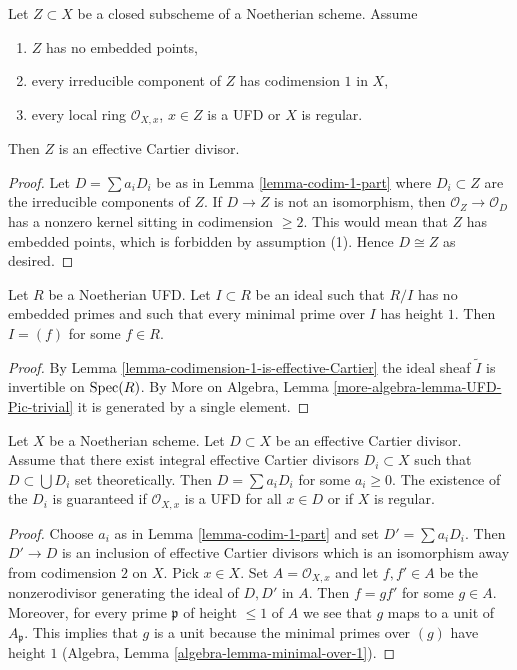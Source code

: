 \begin{lemma}
\label{lemma-codimension-1-is-effective-Cartier}
Let $Z \subset X$ be a closed subscheme of a Noetherian scheme. Assume
\begin{enumerate}
\item $Z$ has no embedded points,
\item every irreducible component of $Z$ has codimension $1$ in $X$,
\item every local ring $\mathcal{O}_{X, x}$, $x \in Z$ is
a UFD or $X$ is regular.
\end{enumerate}
Then $Z$ is an effective Cartier divisor.
\end{lemma}

\begin{proof}
Let $D = \sum a_i D_i$ be as in Lemma \ref{lemma-codim-1-part}
where $D_i \subset Z$ are the irreducible components of $Z$.
If $D \to Z$ is not an isomorphism, then $\mathcal{O}_Z \to \mathcal{O}_D$
has a nonzero kernel sitting in codimension $\geq 2$. This
would mean that $Z$ has embedded points, which is forbidden
by assumption (1). Hence $D \cong Z$ as desired.
\end{proof}

\begin{lemma}
\label{lemma-UFD-one-equation-CM}
Let $R$ be a Noetherian UFD. Let $I \subset R$ be an ideal
such that $R/I$ has no embedded primes and such that
every minimal prime over $I$ has height $1$.
Then $I = (f)$ for some $f \in R$.
\end{lemma}

\begin{proof}
By Lemma \ref{lemma-codimension-1-is-effective-Cartier}
the ideal sheaf $\tilde I$ is invertible on $\mathop{\mathrm{Spec}}(R)$.
By More on Algebra, Lemma \ref{more-algebra-lemma-UFD-Pic-trivial}
it is generated by a single element.
\end{proof}

\begin{lemma}
\label{lemma-effective-Cartier-divisor-is-a-sum}
Let $X$ be a Noetherian scheme. Let $D \subset X$ be an effective
Cartier divisor. Assume that there exist integral effective Cartier
divisors $D_i \subset X$ such that $D \subset \bigcup D_i$
set theoretically. Then $D = \sum a_i D_i$ for some $a_i \geq 0$.
The existence of the $D_i$ is guaranteed if $\mathcal{O}_{X, x}$
is a UFD for all $x \in D$ or if $X$ is regular.
\end{lemma}

\begin{proof}
Choose $a_i$ as in Lemma \ref{lemma-codim-1-part} and set $D' = \sum a_i D_i$.
Then $D' \to D$ is an inclusion of effective Cartier divisors which
is an isomorphism away from codimension $2$ on $X$. Pick $x \in X$.
Set $A = \mathcal{O}_{X, x}$ and let $f, f' \in A$ be the nonzerodivisor
generating the ideal of $D, D'$ in $A$. Then $f = gf'$ for some $g \in A$.
Moreover, for every prime $\mathfrak p$ of height $\leq 1$ of $A$ we see
that $g$ maps to a unit of $A_\mathfrak p$. This implies that $g$ is
a unit because the minimal primes over $(g)$ have height $1$
(Algebra, Lemma \ref{algebra-lemma-minimal-over-1}).
\end{proof}

